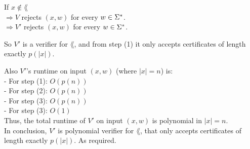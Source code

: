 If $x \notin \lang$ \\
$\Rightarrow V$ rejects $(x, w)$ for every $w \in \Sigma^*$. \\
$\Rightarrow V'$ rejects $(x, w)$ for every $w \in \Sigma^*$.

So $V'$ is a verifier for $\lang$, and from step (1) it only accepts certificates of length exactly $p(|x|)$.

\pagebreak

Also $V'$'s runtime on input $(x, w)$ (where $|x|=n$) is: \\
- For step (1): $O(p(n))$ \\
- For step (2): $O(p(n))$ \\
- For step (3): $O(p(n))$ \\
- For step (3): $O(1)$ \\

Thus, the total runtime of $V'$ on input  $(x, w)$ is polynomial in $|x|=n$. \\

In conclusion, $V'$ is polynomial verifier for $\lang$, that only accepts certificates of length exactly $p(|x|)$.
As required.



